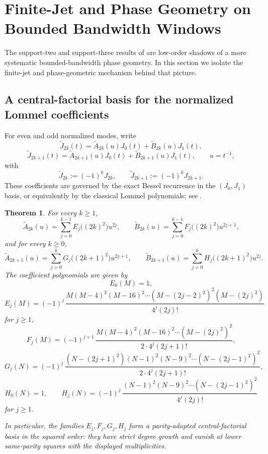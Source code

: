 \documentclass[11pt,reqno]{amsart}
\newtheorem{theorem}{Theorem}[section]
\theoremstyle{definition}
\begin{document}
\section{Finite-Jet and Phase Geometry on Bounded Bandwidth Windows}\label{sec:finite-jet}

The support-two and support-three results of  are low-order shadows of a
more systematic bounded-bandwidth phase geometry. In this section we isolate the finite-jet and
phase-geometric mechanism behind that picture.

\subsection*{A central-factorial basis for the normalized Lommel coefficients}

For even and odd normalized modes, write
\[
\widetilde J_{2k}(t)=\widetilde A_{2k}(u)J_0(t)+\widetilde B_{2k}(u)J_1(t),
\]
\[
\widetilde J_{2k+1}(t)=\widetilde A_{2k+1}(u)J_0(t)+\widetilde B_{2k+1}(u)J_1(t),
\qquad
u=t^{-1},
\]
with
\[
\widetilde J_{2k}:=(-1)^kJ_{2k},
\qquad
\widetilde J_{2k+1}:=(-1)^kJ_{2k+1}.
\]
These coefficients are governed by the exact Bessel recurrence in the $(J_0,J_1)$ basis, or
equivalently by the classical Lommel polynomials; see \cite[\S10.74]{DLMF}.

\begin{theorem}\label{thm:central-factorial-basis}
For every $k\ge 1$,
\[
\widetilde A_{2k}(u)=\sum_{j=0}^{k-1} E_j\bigl((2k)^2\bigr)u^{2j},
\qquad
\widetilde B_{2k}(u)=\sum_{j=0}^{k-1} F_j\bigl((2k)^2\bigr)u^{2j+1},
\]
and for every $k\ge 0$,
\[
\widetilde A_{2k+1}(u)=\sum_{j=0}^{k} G_j\bigl((2k+1)^2\bigr)u^{2j+1},
\qquad
\widetilde B_{2k+1}(u)=\sum_{j=0}^{k} H_j\bigl((2k+1)^2\bigr)u^{2j}.
\]
The coefficient polynomials are given by
\[
E_0(M)=1,
\]
\[
E_j(M)
=
(-1)^j\,
\frac{
M(M-4)^2(M-16)^2\cdots(M-(2j-2)^2)^2(M-(2j)^2)
}
{4^j(2j)!}
\]
for $j\ge 1$,
\[
F_j(M)
=
(-1)^{j+1}\,
\frac{
M(M-4)^2(M-16)^2\cdots(M-(2j)^2)^2
}
{2\cdot 4^j(2j+1)!},
\]
\[
G_j(N)
=
(-1)^j\,
\frac{
(N-(2j+1)^2)(N-1)^2(N-9)^2\cdots(N-(2j-1)^2)^2
}
{2\cdot 4^j(2j+1)!},
\]
\[
H_0(N)=1,
\qquad
H_j(N)
=
(-1)^j\,
\frac{
(N-1)^2(N-9)^2\cdots(N-(2j-1)^2)^2
}
{4^j(2j)!}
\]
for $j\ge 1$.

In particular, the families $E_j,F_j,G_j,H_j$ form a parity-adapted central-factorial basis in
the squared order: they have strict degree growth and vanish at lower same-parity squares with
the displayed multiplicities.
\end{theorem}
\end{document}
